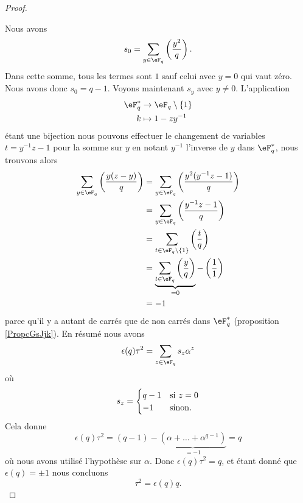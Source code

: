 \begin{proof}
\begin{itemize}
    \end{itemize}
    Nous avons 
    \begin{equation}
        s_0=\sum_{y\in \eF_q}\left(\frac{y^2}{q}\right).
    \end{equation}
    Dans cette somme, tous les termes sont \( 1\) sauf celui avec \( y=0\) qui vaut zéro. Nous avons donc \( s_0=q-1\). Voyons maintenant \( s_y\) avec \( y\neq 0\). L'application
    \begin{equation}
        \begin{aligned}
            \eF^*_q&\to \eF_q\setminus\{ 1 \} \\
            k&\mapsto 1-zy^{-1} 
        \end{aligned}
    \end{equation}
    étant une bijection nous pouvons effectuer le changement de variables \( t=y^{-1}z-1\) pour la somme sur \( y\) en notant \( y^{-1}\) l'inverse de \( y\) dans \( \eF^*_q\), nous trouvons alors
    \begin{subequations}
        \begin{align}
            \sum_{y\in \eF_q}\left(\frac{y(z-y)}{q}\right)&=\sum_{y\in \eF_q}\left(\frac{y^2(y^{-1}z-1)}{q}\right)\\
            &=\sum_{y\in \eF_q}\left(\frac{y^{-1}z-1}{q}\right)\\
            &=\sum_{t\in \eF_q\setminus\{ 1 \}}\left(\frac{t}{q}\right)\\
            &=\underbrace{\sum_{t\in \eF_q}\left(\frac{y}{q}\right)}_{=0}-\left(\frac{1}{1}\right)\\
            &=-1
        \end{align}
    \end{subequations}
    parce qu'il  y a autant de carrés que de non carrés dans \( \eF_q^*\) (proposition \ref{PropcGsJjk}). En résumé nous avons
    \begin{equation}
        \epsilon(q)\tau^2=\sum_{z\in \eF_q}s_z\alpha^z
    \end{equation}
    où
    \begin{equation}
        s_z=\begin{cases}
            q-1    &   \text{si \( z=0\)}\\
            -1    &    \text{sinon}.
        \end{cases}
    \end{equation}
    Cela donne
    \begin{equation}
        \epsilon(q)\tau^2=(q-1)-\underbrace{(\alpha+\ldots +\alpha^{q-1})}_{=-1}=q
    \end{equation}
    où nous avons utilisé l'hypothèse sur \( \alpha\). Donc \( \epsilon(q)\tau^2=q\), et étant donné que \( \epsilon(q)=\pm 1\) nous concluons
    \begin{equation}
        \tau^2=\epsilon(q)q.
    \end{equation}
    

\end{proof}
